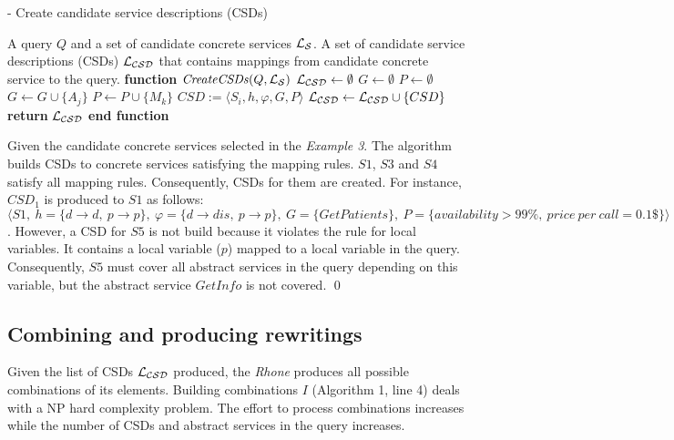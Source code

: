 \begin{algorithm}[h!]
\caption{ - Create candidate service descriptions (CSDs)}
\label{creatingcsds}
\begin{algorithmic}[1]
\REQUIRE A query $Q$ and a set of candidate concrete services $\hbox{${\cal L_{S}}$}$.
\ENSURE A set of candidate service descriptions (CSDs) $\hbox{${\cal L_{CSD}}$}$ that contains mappings from candidate concrete service to the query.
\STATE \textbf{function} $\mathit{CreateCSDs} (Q, \hbox{${\cal L_{S}}$})$
\STATE $\hbox{${\cal L_{CSD}}$} \leftarrow \emptyset$
		\STATE $G \leftarrow \emptyset$	
		\STATE $P \leftarrow \emptyset$		
			\STATE $G \leftarrow G \cup \lbrace A_{j} \rbrace$ 
		\ENDFOR
			\STATE $P \leftarrow P \cup \lbrace M_{k} \rbrace$ 
		\ENDFOR
		\STATE $CSD := \langle S_{i}, h, \varphi, G, P \rangle$	
		\STATE $\hbox{${\cal L_{CSD}}$} \leftarrow \hbox{${\cal L_{CSD}}$} \cup \lbrace CSD \rbrace$	
	\ENDIF
\ENDFOR
\STATE \textbf{return} $\hbox{${\cal L_{CSD}}$}$
\STATE \textbf{end function}
\end{algorithmic}
\end{algorithm}

\begin{example}%
Given the candidate concrete services selected in the \textit{Example 3}. The algorithm builds CSDs to concrete services satisfying the mapping rules. $S1$, $S3$ and $S4$ satisfy all mapping rules. Consequently, CSDs for them are created. For instance, $CSD_{1}$ is produced to $S1$ as follows: 
$\langle S1, \ h = \lbrace d \rightarrow d, \ p \rightarrow p \rbrace, \ \varphi = \lbrace d \rightarrow dis, \ p \rightarrow p \rbrace, \ G = \lbrace GetPatients \rbrace, \ P = \lbrace availability > 99\%, \ price \ per \ call = 0.1\$ \rbrace \rangle$. However, a CSD for $S5$ is not build because it violates the rule for local variables. It contains a local variable ($p$) mapped to a local variable in the query. Consequently, $S5$ must cover all abstract services in the query depending on this variable, but the abstract service $GetInfo$ is not covered.
\qed
\end{example}

 

\subsection{Combining and producing rewritings}
Given the list of CSDs $\hbox{${\cal L_{CSD}}$}$ produced, the \textit{Rhone} produces all possible combinations of its elements. 
Building combinations $I$ (Algorithm 1, line 4) deals with a NP hard complexity problem.
The effort to process combinations increases while the number of CSDs and abstract services in the query increases.

